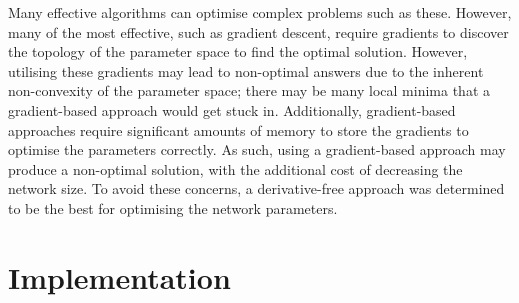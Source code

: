 \documentclass{l4proj}
\begin{document}
Many effective algorithms can optimise complex problems such as these. However, many of the most effective, such as gradient descent, require gradients to discover the topology of the parameter space to find the optimal solution. However, utilising these gradients may lead to non-optimal answers due to the inherent non-convexity of the parameter space; there may be many local minima that a gradient-based approach would get stuck in. Additionally, gradient-based approaches require significant amounts of memory to store the gradients to optimise the parameters correctly. As such, using a gradient-based approach may produce a non-optimal solution, with the additional cost of decreasing the network size. To avoid these concerns, a derivative-free approach was determined to be the best for optimising the network parameters.

\chapter{Implementation} \label{chap:implementation}





\end{document}
